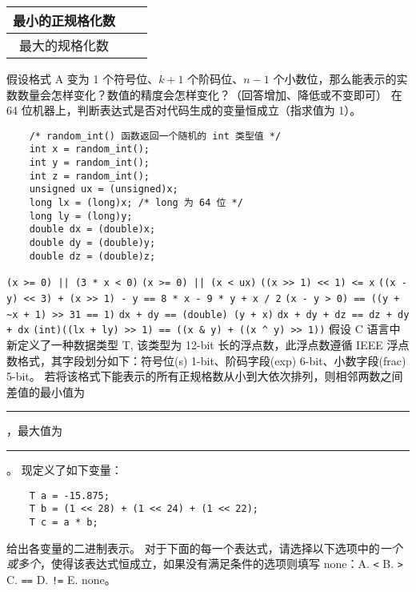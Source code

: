 \begin{problems}
\begin{table}[H]
\begin{tabular}{|c|c|c|}
                    最小的正规格化数 & {\qquad \qquad} & {\qquad \qquad} \\ \hline
                    最大的规格化数 & {\qquad \qquad} & {\qquad \qquad} \\ \hline
                \end{tabular}
            \end{table}
            \qn 假设格式 A 变为 1 个符号位、$k+1$ 个阶码位、$n-1$ 个小数位，那么能表示的实数数量会怎样变化？数值的精度会怎样变化？（回答增加、降低或不变即可）
         在 64 位机器上，判断表达式是否对代码生成的变量恒成立（指求值为 1）。
        \begin{verbatim}
    /* random_int() 函数返回一个随机的 int 类型值 */
    int x = random_int();
    int y = random_int();
    int z = random_int();
    unsigned ux = (unsigned)x;
    long lx = (long)x; /* long 为 64 位 */
    long ly = (long)y;
    double dx = (double)x;
    double dy = (double)y;
    double dz = (double)z;
        \end{verbatim}
            \qn \verb+(x >= 0) || (3 * x < 0)+
            \qn \verb+(x >= 0) || (x < ux)+
            \qn \verb|((x >> 1) << 1) <= x|
            \qn \verb|((x - y) << 3) + (x >> 1) - y == 8 * x - 9 * y + x / 2|
            \qn \verb|(x - y > 0) == ((y + ~x + 1) >> 31 == 1)|
            \qn \verb|dx + dy == (double) (y + x)|
            \qn \verb|dx + dy + dz == dz + dy + dx|
            \qn \verb|(int)((lx + ly) >> 1) == ((x & y) + ((x ^ y) >> 1))|
         假设 C 语言中新定义了一种数据类型 T, 该类型为 12-bit 长的浮点数，此浮点数遵循 IEEE 浮点数格式，其字段划分如下：符号位(s) 1-bit、阶码字段(exp) 6-bit、小数字段(frac) 5-bit。
            \qn 若将该格式下能表示的所有正规格数从小到大依次排列，则相邻两数之间差值的最小值为 \rule{2.5cm}{0.25mm}，最大值为 \rule{2.5cm}{0.25mm}。
            \qn 现定义了如下变量：
            \begin{verbatim}
    T a = -15.875;
    T b = (1 << 28) + (1 << 24) + (1 << 22);
    T c = a * b;
            \end{verbatim}
            给出各变量的二进制表示。
         对于下面的每一个表达式，请选择以下选项中的\emph{一个或多个}，使得该表达式恒成立，如果没有满足条件的选项则填写 none：A. \texttt{<} \quad B. \texttt{>} \quad C. \texttt{==} \quad D. \texttt{!=} \quad E. none。
        

\end{problems}
